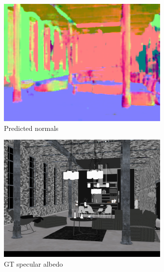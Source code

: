 \begin{figure}
\begin{subfigure}{0.32\linewidth}
\includegraphics[width=\linewidth]{praca/images/AI46_009_Cam01.VRayLightSelect_RE_L0.normal_output.png}
    \caption{Predicted normals}
  \end{subfigure}
  \begin{subfigure}{0.32\linewidth}
    \includegraphics[width=\linewidth]{praca/images/AI46_009_Cam01.VRayLightSelect_RE_L0.specular.png}
    \caption{GT specular albedo}
  \end{subfigure}
  \begin{subfigure}{0.32\linewidth}

\end{subfigure}
\end{figure}
